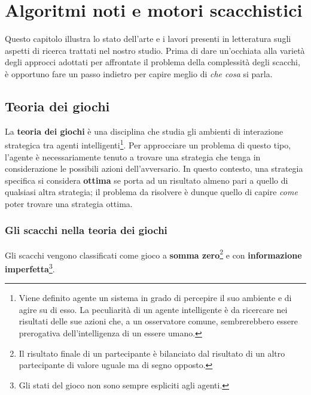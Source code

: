 \chapter{Algoritmi noti e motori scacchistici} %
%
\begin{citazione}
    Questo capitolo illustra lo stato dell'arte e i lavori presenti in letteratura sugli aspetti di ricerca trattati nel nostro studio. 
    Prima di dare un'occhiata alla varietà degli approcci adottati per affrontate il problema della complessità degli scacchi, 
    è opportuno fare un passo indietro per capire meglio di \textit{che cosa} si parla.
\end{citazione}

\section{Teoria dei giochi}
La \textbf{teoria dei giochi} è una disciplina che studia gli ambienti di interazione strategica tra
agenti intelligenti\footnote{Viene definito agente un sistema in grado di percepire il suo ambiente e di agire su di esso. La peculiarità
di un agente intelligente è da ricercare nei risultati delle sue azioni che, a un osservatore comune, sembrerebbero essere prerogativa
dell'intelligenza di un essere umano.}. Per approcciare un problema di questo tipo, l'agente è necessariamente tenuto a trovare
una strategia che tenga in considerazione le possibili azioni dell'avversario. In questo contesto, una strategia specifica si considera
\textbf{ottima} se porta ad un risultato almeno pari a quello di qualsiasi altra strategia; il problema da risolvere è dunque 
quello di capire \textit{come} poter trovare una strategia ottima.

\subsection{Gli scacchi nella teoria dei giochi}
Gli scacchi vengono classificati come gioco a \textbf{somma zero}\footnote{Il risultato finale di un partecipante
è bilanciato dal risultato di un altro partecipante di valore uguale ma di segno opposto.} e con \textbf{informazione imperfetta}\footnote{Gli stati
del gioco non sono sempre espliciti agli agenti.}.

\newpage